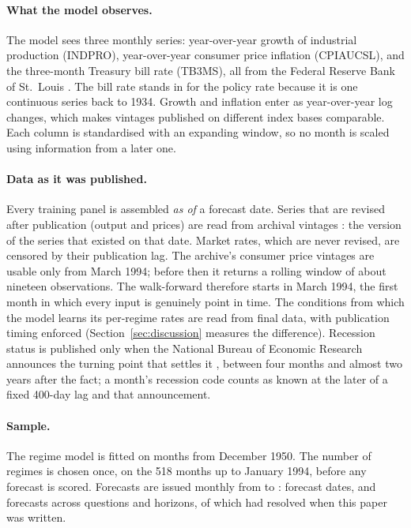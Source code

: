 \documentclass[11pt]{article}
\begin{document}
\paragraph{What the model observes.} The model sees three monthly series: year-over-year growth of
industrial production (INDPRO), year-over-year consumer price inflation (CPIAUCSL), and the three-month
Treasury bill rate (TB3MS), all from the Federal Reserve Bank of St.\ Louis
\citep{stlouisfed2026fred,stlouisfed2026alfred}. The bill rate stands in for the policy rate because it
is one continuous series back to 1934. Growth and inflation enter as year-over-year log changes, which
makes vintages published on different index bases comparable. Each column is standardised with an
expanding window, so no month is scaled using information from a later one.

\paragraph{Data as it was published.} Every training panel is assembled \emph{as of} a forecast date.
Series that are revised after publication (output and prices) are read from archival vintages
\citep{stlouisfed2026alfred}: the version of the series that existed on that date. Market rates, which
are never revised, are censored by their publication lag. The archive's consumer price vintages are
usable only from March 1994; before then it returns a rolling window of about nineteen observations. The
walk-forward therefore starts in March 1994, the first month in which every input is genuinely point in
time. The conditions from which the model learns its per-regime rates are read from final data, with
publication timing enforced (Section~\ref{sec:discussion} measures the difference). Recession status is published only when the National Bureau of Economic Research announces the
turning point that settles it \citep{nber2026cycles,nber2026announcements}, between four months and almost
two years after the fact; a month's recession code counts as known at the later of a fixed 400-day lag
and that announcement.

\paragraph{Sample.} The regime model is fitted on months from December 1950. The number of regimes is
chosen once, on the 518 months up to January 1994, before any forecast is scored. Forecasts are issued
monthly from \FirstForecastMonth{} to \LastForecastMonth: \ForecastDates{} forecast dates, and
\ForecastCount{} forecasts across questions and horizons, of which \ResolvedCount{} had resolved when
this paper was written.
\end{document}
